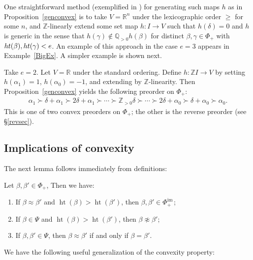 \documentclass[Unicode,ALCO]{cedram}
\newcommand{\im}{\operatorname{im}}
\newcommand{\height}{\operatorname{ht}}
\newcommand{\Z}{\mathbb{Z}}
\newcommand{\0}{{\bar 0}}
\newcommand{\RR}{{\mathbb R}}
\newcommand{\QQ}{{\mathbb Q}}
\newcommand{\ZZ}{{\mathbb Z}}
\def\height{{\operatorname{ht}}}
\def\height{{\operatorname{ht}}}
\def\im{{\mathrm{im}\,}}
\begin{document}
One straightforward method (exemplified in \cite[Example 3.6]{McNRepKLR3}) for generating such maps \(h\) as in Proposition~\ref{genconvex} is to 
take \(V=\RR^n\) under the lexicographic order \(\geq\) for some \(n\), and \(\Z\)-linearly extend some set map \(h: I \to V\) such that \(h(\delta)= 0\) and \(h\) is generic in the sense that \(h(\gamma) \notin \QQ_{> 0} h(\beta)\) for distinct \(\beta, \gamma \in \Phi_+\) with \(\textup{ht}(\beta), \textup{ht}(\gamma) < e\).
An example of this approach in the case \(e=3\) appears in Example~\ref{BigEx}. A simpler example is shown next. 

\begin{exam}\label{e2order}
Take \(e=2\). Let \(V = \RR\) under the standard ordering. Define \(h: \ZZ I \to V\) by setting \(h(\alpha_1) = 1\), \(h(\alpha_0) = -1\), and extending by \(\ZZ\)-linearity. Then Proposition~\ref{genconvex} yields the following preorder on \(\Phi_+\):
\begin{align*}
\alpha_1 \succ
\delta+\alpha_1 
\succ
2\delta+\alpha_1
\succ
\cdots
\succ
\ZZ_{>0}\delta
\succ
\cdots
\succ
2\delta+\alpha_0
\succ
\delta+\alpha_0
\succ
\alpha_0.
\end{align*}
This is one of two convex preorders on \(\Phi_+\); the other is the reverse preorder (see \S\ref{revsec}).
\end{exam}

\subsection{Implications of convexity} 
The next lemma follows immediately from definitions:
\begin{lemma}\label{notapprox}
Let \(\beta, \beta' \in \Phi_+\), Then we have:
\begin{enumerate}
\item If \(\beta \approx \beta'\) and \(\height(\beta) > \height(\beta')\), then \(\beta, \beta' \in \Phi_+^\im\); \label{cond:notapprox1}
\item If \(\beta \in \Psi\) and \(\height(\beta) > \height(\beta')\), then \(\beta \not \approx \beta'\); \label{cond:notapprox2}
\item If \(\beta, \beta' \in \Psi\), then \(\beta \approx \beta'\) if and only if \(\beta = \beta'\). \label{cond:notapprox3}
\end{enumerate}
\end{lemma}


We have the following useful generalization of the convexity property:
\end{document}

